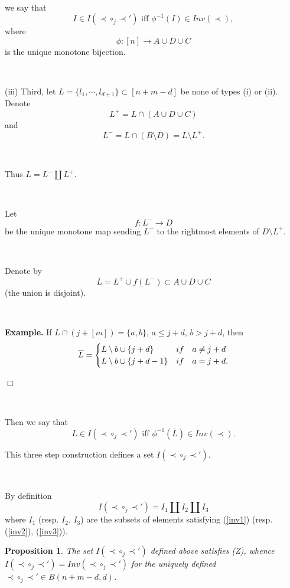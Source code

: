\documentclass[12pt,a4paper]{article}
\newtheorem{prop}[theorem]{Proposition}
\begin{document}
\

we say that 
  \begin{equation}\label{inv2}
  I\in I(\prec\circ_j\prec') \mbox{ iff } \phi^{-1}(I)\in Inv(\prec),
 \end{equation}
  where
   \[
   \phi: [n] \to A\cup D \cup C
   \]
   is the unique monotone bijection.
   
   \
   
 (iii)   Third, let $L=\{l_1, \cdots, l_{d+1}\} \subset [n+m-d]$ be none of types (i) or (ii). 
  Denote 
  \[
  L^+=L\cap (A\cup D\cup C)
  \]
  and  
  \[ 
  L^-=L\cap (B\setminus D) = L\setminus L^+.
  \] 
 
 \
 
 
 Thus $L = L^-\coprod L^+$.
 
 \
 
 Let   
 \[f:L^-\to D\]
 be the unique monotone map sending $L^-$ to the rightmost elements of $ D\setminus L^+$. 

\

Denote by 
 \[
 \overline L=L^+\cup f(L^-)\subset A\cup D\cup C
 \]
 (the union is disjoint).
 
 \
 
 {\bf Example.} If $L\cap (j+[m])=\{a, b\}$,  $a\le j+d$, $b>j+d$, then 
 \[
 \overline L=\begin{cases}
  L\setminus b\cup \{j+d\}& if \quad a\neq j+d\cr
 L\setminus b\cup \{j+d-1\} & if\quad  a=j+d.
 \end{cases}
 \] 
 
 $\Box$  
 
 \
 
 
 Then we say that 
  \begin{equation}\label{inv3}
  L\in I (\prec\circ_j\prec' ) \mbox{  iff }  \phi^{-1}(\overline L) \in Inv(\prec).
  \end{equation}
  
  This three step construction defines a set  $I(\prec\circ_j\prec')$.
  
  \
 

By definition
\begin{equation}\label{coprod-I}
I (\prec\circ_j\prec') = I_1\coprod I_2\coprod I_3
\end{equation}
where $I_1$ (resp. $I_2$, $I_3$) are the subsets of elements satisfying (\ref{inv1}) (resp. (\ref{inv2}), 
(\ref{inv3})). 
 
   \begin{prop}\label{inv-prop}
 The set $I(\prec\circ_j\prec')$ defined above satisfies (Z), whence $I(\prec\circ_j\prec') = Inv(\prec\circ_j\prec')$ for the uniquely defined $\prec\circ_j\prec'\in B(n+m-d,d)$.
 \end{prop}
 
\end{document}
